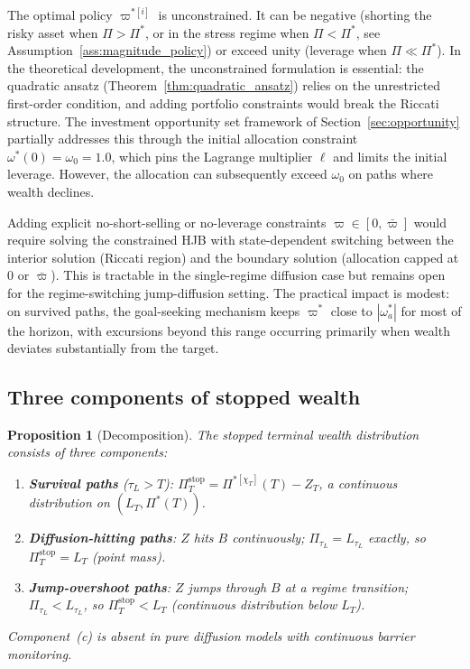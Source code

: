 \documentclass[11pt,a4paper]{article}
\numberwithin{equation}{section}
\newtheorem{proposition}[theorem]{Proposition}
\begin{document}
The optimal policy $\varpi^{*[i]}$ is unconstrained. It can be negative (shorting the risky asset when $\Pi > \Pi^*$, or in the stress regime when $\Pi < \Pi^*$, see Assumption~\ref{ass:magnitude_policy}) or exceed unity (leverage when $\Pi \ll \Pi^*$). In the theoretical development, the unconstrained formulation is essential: the quadratic ansatz (Theorem~\ref{thm:quadratic_ansatz}) relies on the unrestricted first-order condition, and adding portfolio constraints would break the Riccati structure.  The investment opportunity set framework of Section~\ref{sec:opportunity} partially addresses this through the initial allocation constraint $\omega^*(0) = \omega_0 =1.0$, which pins the Lagrange multiplier $\ell$ and limits the initial leverage.  However, the allocation can subsequently exceed $\omega_0$ on paths where wealth declines.

Adding explicit no-short-selling or no-leverage constraints $\varpi \in [0, \bar\varpi]$ would require solving the constrained HJB with state-dependent switching between the interior solution (Riccati region) and the boundary solution (allocation capped at $0$ or $\bar\varpi$).  This is tractable in the single-regime diffusion case \citep{HuShiXu2022} but remains open for the regime-switching jump-diffusion setting.  The practical impact is modest: on survived paths, the goal-seeking mechanism keeps $\varpi^*$ close to $|\omega^*_a|$ for most of the horizon, with excursions beyond this range occurring primarily when wealth deviates substantially from the target.


\subsection{Three components of stopped wealth}\label{sec:three_comp}

\begin{proposition}[Decomposition]\label{prop:three_components}
The stopped terminal wealth distribution consists of three components:
\begin{enumerate}[label=(\alph*)]
\item \textbf{Survival paths} ($\tau_L > T$): $\Pi^{\mathrm{stop}}_T = \Pi^{*[\chi_T]}(T) - Z_T$, a continuous distribution on $(L_T, \Pi^*(T))$.
\item \textbf{Diffusion-hitting paths}: $Z$ hits $B$ continuously; $\Pi_{\tau_L} = L_{\tau_L}$ exactly, so $\Pi^{\mathrm{stop}}_T = L_T$ (point mass).
\item \textbf{Jump-overshoot paths}: $Z$ jumps through $B$ at a regime transition; $\Pi_{\tau_L} < L_{\tau_L}$, so $\Pi^{\mathrm{stop}}_T < L_T$ (continuous distribution below $L_T$).
\end{enumerate}
Component~(c) is absent in pure diffusion models with continuous barrier monitoring.
\end{proposition}
\end{document}
